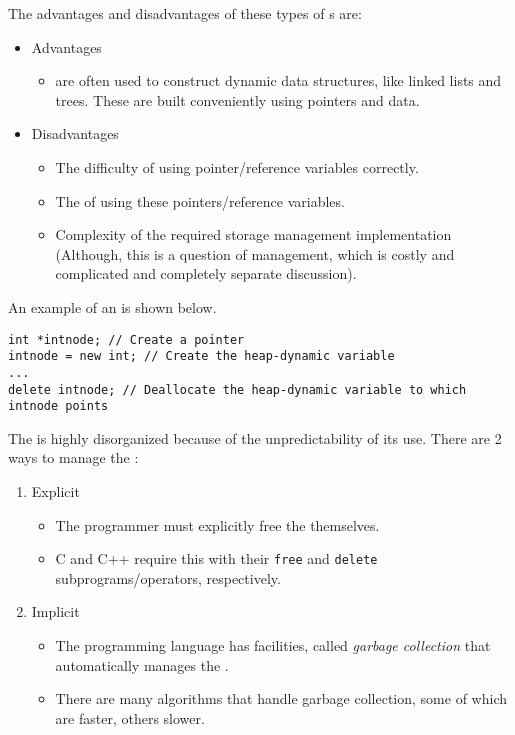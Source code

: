 \begin{definition}
  The advantages and disadvantages of these types of s are:
  \begin{itemize}[noitemsep]
  \item Advantages
    \begin{itemize}[noitemsep]
    \item {} are often used to construct dynamic data structures, like linked lists and trees. These are built conveniently using pointers and data.
    \end{itemize}
  \item Disadvantages
    \begin{itemize}[noitemsep]
    \item The difficulty of using pointer/reference variables correctly.
    \item The  of using these pointers/reference variables.
    \item Complexity of the required storage management implementation (Although, this is a question of  management, which is costly and complicated and completely separate discussion).
    \end{itemize}
  \end{itemize}
\end{definition}

An example of an  is shown below.
\begin{verbatim}
int *intnode; // Create a pointer
intnode = new int; // Create the heap-dynamic variable
...
delete intnode; // Deallocate the heap-dynamic variable to which intnode points
\end{verbatim}

The  is highly disorganized because of the unpredictability of its use.
There are 2 ways to manage the :
\begin{enumerate}[noitemsep]
\item Explicit 
  \begin{itemize}[noitemsep]
  \item The programmer must explicitly free the  themselves.
  \item C and C++ require this with their \texttt{free} and \texttt{delete} subprograms/operators, respectively.
  \end{itemize}
\item Implicit 
  \begin{itemize}[noitemsep]
  \item The programming language has facilities, called \emph{garbage collection} that automatically manages the .
  \item There are many algorithms that handle garbage collection, some of which are faster, others slower.
  \end{itemize}
\end{enumerate}


